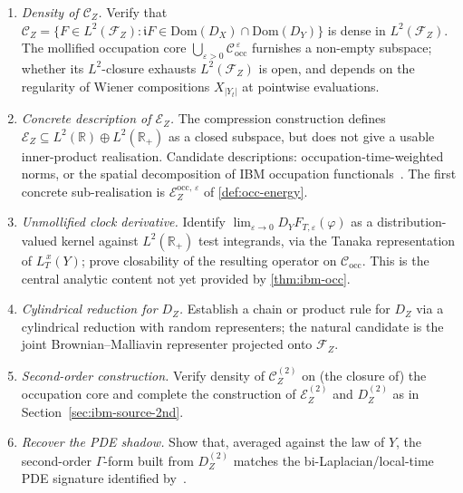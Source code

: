 \documentclass[11pt,reqno]{amsart}
\theoremstyle{plain}
\theoremstyle{definition}
\theoremstyle{remark}
\newcommand{\R}{\mathbb{R}}
\newcommand{\Dom}{\mathrm{Dom}}
\newcommand{\Energy}{\mathcal{E}}
\renewcommand{\iota}{\mathfrak{i}}
\newcommand{\IBM}{Z}
\newcommand{\Carre}{\Gamma}
\begin{document}
\begin{enumerate}
\item \emph{Density of $\mathcal C_\IBM$.} Verify that
  $\mathcal C_\IBM=\{F\in L^{2}(\mathcal F_\IBM):\iota F\in\Dom(D_X)\cap\Dom(D_Y)\}$
  is dense in $L^{2}(\mathcal F_\IBM)$. The mollified occupation core
  $\bigcup_{\varepsilon>0}\mathcal C_{\mathrm{occ}}^{\,\varepsilon}$
  furnishes a non-empty subspace; whether its $L^{2}$-closure exhausts
  $L^{2}(\mathcal F_\IBM)$ is open, and depends on the regularity of
  Wiener compositions $X_{|Y_{t}|}$ at pointwise evaluations.

\item \emph{Concrete description of $\Energy_\IBM$.} The compression
  construction defines $\Energy_\IBM\subseteq L^{2}(\R)\oplus L^{2}(\R_{+})$
  as a closed subspace, but does not give a usable inner-product
  realisation. Candidate descriptions: occupation-time-weighted norms,
  or the spatial decomposition of IBM occupation
  functionals~\cite{Fontes-IBMchaos}. The first concrete sub-realisation
  is $\Energy_\IBM^{\mathrm{occ},\,\varepsilon}$ of
  \cref{def:occ-energy}.

\item \emph{Unmollified clock derivative.} Identify
  $\lim_{\varepsilon\to 0} D_Y F_{T,\varepsilon}(\varphi)$ as a
  distribution-valued kernel against $L^{2}(\R_{+})$ test integrands,
  via the Tanaka representation of $L_T^{\,x}(Y)$; prove closability of
  the resulting operator on $\mathcal C_{\mathrm{occ}}$. This is the
  central analytic content not yet provided by \cref{thm:ibm-occ}.

\item \emph{Cylindrical reduction for $D_\IBM$.} Establish a chain or
  product rule for $D_\IBM$ via a cylindrical reduction with random
  representers; the natural candidate is the joint Brownian--Malliavin
  representer projected onto $\mathcal F_\IBM$.

\item \emph{Second-order construction.} Verify density of
  $\mathcal C_\IBM^{(2)}$ on (the closure of) the occupation core and
  complete the construction of $\Energy_\IBM^{(2)}$ and $D_\IBM^{(2)}$
  as in Section~\ref{sec:ibm-source-2nd}.

\item \emph{Recover the PDE shadow.} Show that, averaged against the
  law of $Y$, the second-order $\Carre$-form built from
  $D_\IBM^{(2)}$ matches the bi-Laplacian/local-time PDE signature
  identified by~\cite{AllouZheng}.


\end{enumerate}
\end{document}
